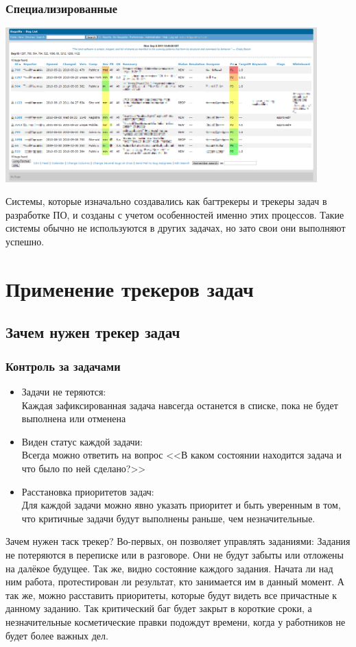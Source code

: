 \documentclass{../industrial-development}
\begin{document}
\begin{frame} \frametitle{Специализированные}
	\centerline{\includegraphics[width=0.9\textwidth]{bugzilla.png}}
\end{frame}

\lecturenotes
Системы, которые изначально создавались как багтрекеры и трекеры задач в разработке ПО, и созданы с учетом особенностей именно этих процессов. Такие системы обычно не используются в других задачах, но зато свои они выполняют успешно.

\section{Применение трекеров задач}

\subsection{Зачем нужен трекер задач}

\begin{frame} \frametitle{Контроль за задачами}
	\begin{itemize}
		\item Задачи не теряются:\\
		Каждая зафиксированная задача навсегда останется в списке, пока не будет выполнена или отменена
		\item Виден статус каждой задачи:\\
		Всегда можно ответить на вопрос <<В каком состоянии находится задача и что было по ней сделано?>>
		\item Расстановка приоритетов задач:\\
		Для каждой задачи можно явно указать приоритет и быть уверенным в том, что критичные задачи будут выполнены раньше, чем незначительные.
	\end{itemize}
\end{frame}

\lecturenotes
Зачем нужен таск трекер?
Во-первых, он позволяет управлять заданиями: 
Задания не потеряются в переписке или в разговоре. Они не будут забыты или отложены на далёкое будущее.
Так же, видно состояние каждого задания. Начата ли над ним работа, протестирован ли результат, кто занимается им в данный момент.
А так же, можно расставить приоритеты, которые будут видеть все причастные к данному заданию. Так критический баг будет закрыт в короткие сроки, а незначительные косметические правки подождут времени, когда у работников не будет более важных дел.
\end{document}
